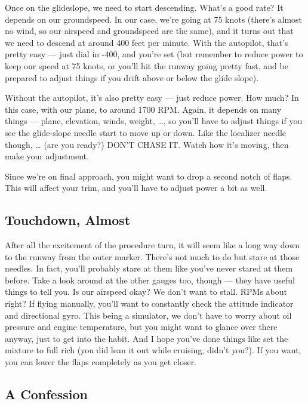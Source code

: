 Once on the glideslope, we need to start descending.  What's a good
rate?  It depends on our groundspeed.  In our case, we're going at 75
knots (there's almost no wind, so our airspeed and groundspeed are the
same), and it turns out that we need to descend at around 400 feet per
minute.  With the autopilot, that's pretty easy --- just dial in -400,
and you're set (but remember to reduce power to keep our speed at 75
knots, or you'll hit the runway going pretty fast, and be prepared to
adjust things if you drift above or below the glide
slope).

Without the autopilot, it's also pretty easy --- just reduce power.
How much?  In this case, with our plane, to around 1700 RPM.  Again,
it depends on many things --- plane, elevation, winds, weight,
\ldots{}, so you'll have to adjust things if you see the glide-slope
needle start to move up or down.  Like the localizer needle though,
\ldots{} (are you ready?)  DON'T CHASE IT.  Watch how it's moving,
then make your adjustment.

Since we're on final approach, you might want to drop a second notch
of flaps.  This will affect your trim, and you'll have to adjust power
a bit as well.

\subsection{Touchdown, Almost}

After all the excitement of the procedure turn, it will seem like a
long way down to the runway from the outer marker.  There's not much
to do but stare at those needles.  In fact, you'll probably stare at
them like you've never stared at them before.  Take a look around at
the other gauges too, though --- they have useful things to tell you.
Is our airspeed okay?  We don't want to stall.  RPMs about right?  If
flying manually, you'll want to constantly check the attitude
indicator and directional gyro.  This being a simulator, we don't have
to worry about oil pressure and engine temperature, but you might want
to glance over there anyway, just to get into the habit.  And I hope
you've done things like set the mixture to full rich (you did lean it
out while cruising, didn't you?).  If you want, you can lower the
flaps completely as you get closer.

\subsection{A Confession}


